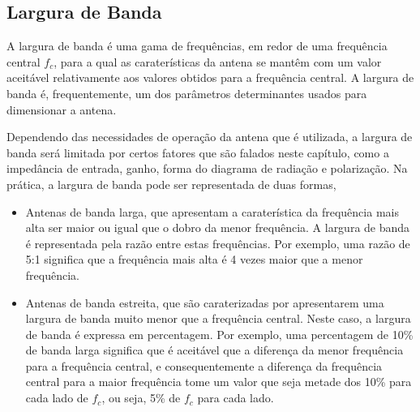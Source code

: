 \subsection*{Largura de Banda}
A largura de banda é uma gama de frequências, em redor de uma frequência central $f_{c}$, para a qual as caraterísticas da antena se mantêm com um valor aceitável relativamente aos valores obtidos para a frequência central. A largura de banda é, frequentemente, um dos parâmetros determinantes usados para dimensionar a antena.\par
Dependendo das necessidades de operação da antena que é utilizada, a largura de banda será limitada por certos fatores que são falados neste capítulo, como a impedância de entrada, ganho, forma do diagrama de radiação e polarização. Na prática, a largura de banda pode ser representada de duas formas,
\begin{itemize}
\item Antenas de banda larga, que apresentam a caraterística da frequência mais alta ser maior ou igual que o dobro da menor frequência. A largura de banda é representada pela razão entre estas frequências. Por exemplo, uma razão de 5:1 significa que a frequência mais alta é 4 vezes maior que a menor frequência.
\item Antenas de banda estreita, que são caraterizadas por apresentarem uma largura de banda muito menor que a frequência central. Neste caso, a largura de banda é expressa em percentagem. Por exemplo, uma percentagem de 10\% de banda larga significa que é aceitável que a diferença da menor frequência para a frequência central, e consequentemente a diferença da frequência central para a maior frequência tome um valor que seja metade dos 10\% para cada lado de $f_{c}$, ou seja, 5\% de $f_{c}$ para cada lado.
\end{itemize}



